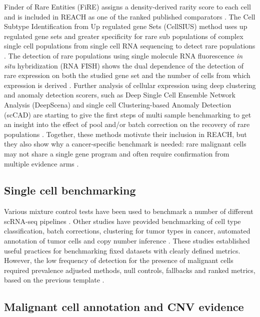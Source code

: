 \documentclass[10pt]{article}
\begin{document}
Finder of Rare Entities (FiRE) assigns a density-derived rarity score to each cell and is included in REACH as one of the ranked published comparators \cite{martens2023rarity}. The Cell Subtype Identification from Up regulated gene Sets (CellSIUS) method uses up regulated gene sets and greater specificity for rare sub populations of complex single cell populations from single cell RNA sequencing to detect rare populations \cite{wegmann2019cellsius}. The detection of rare populations using single molecule RNA fluorescence \textit{in situ} hybridization (RNA FISH) shows the dual dependence of the detection of rare expression on both the studied gene set and the number of cells from which expression is derived \cite{torre2018rare}. Further analysis of cellular expression using deep clustering and anomaly detection scorers, such as Deep Single Cell Ensemble Network Analysis (DeepScena) and single cell Clustering-based Anomaly Detection (scCAD) are starting to give the first steps of multi sample benchmarking to get an insight into the effect of pool and/or batch correction on the recovery of rare populations \cite{lei2023self,xu2024sccad}. Together, these methods motivate their inclusion in REACH, but they also show why a cancer-specific benchmark is needed: rare malignant cells may not share a single gene program and often require confirmation from multiple evidence arms \cite{tirosh2024cancer,ren2018understanding}.

\subsection{Single cell benchmarking}

Various mixture control tests have been used to benchmark a number of different scRNA-seq pipelines \cite{tian2019benchmarking}. Other studies have provided benchmarking of cell type classification, batch corrections, clustering for tumor types in cancer, automated annotation of tumor cells  and copy number inference \cite{abdelaal2019comparison,tran2020benchmark,mahalanabis2022evaluation,chen2025benchmarking,christensen2023evaluation}. These studies established useful practices for benchmarking fixed datasets with clearly defined metrics. However, the low frequency of detection for the presence of malignant cells required prevalence adjusted methods, null controls, fallbacks and ranked metrics, based on the previous template \cite{davis2006relationship,saito2015precision,johnson2019survey}.

\subsection{Malignant cell annotation and CNV evidence}
\end{document}

